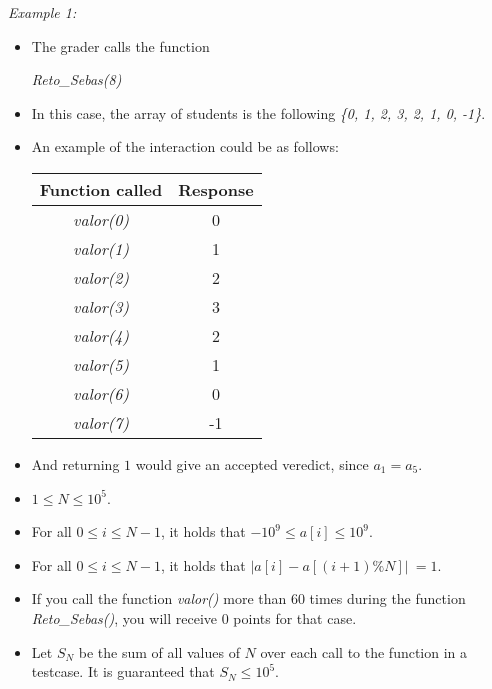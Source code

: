 \documentclass[12pt]{scrartcl}
\begin{document}
        {\itshape Example 1:}
        \begin{itemize}
            \item The grader calls the function 

            \begin{center}
                {\itshape Reto\_Sebas(8)}
            \end{center}

            \item In this case, the array of students is the following {\itshape \{0, 1, 2, 3, 2, 1, 0, -1\}}.
            \item An example of the interaction could be as follows:
            \begin{center}
                \begin{tabular}{|c|c|}
                    \hline
                     Function called & Response \\
                     \hline
                     {\itshape valor(0)} & 0 \\
                     \hline
                     {\itshape valor(1)} & 1 \\
                     \hline
                     {\itshape valor(2)} & 2 \\
                     \hline
                     {\itshape valor(3)} & 3 \\
                     \hline
                     {\itshape valor(4)} & 2 \\
                     \hline
                     {\itshape valor(5)} & 1 \\
                     \hline
                     {\itshape valor(6)} & 0 \\
                     \hline
                     {\itshape valor(7)} & -1 \\
                     \hline
                \end{tabular}
            \end{center}
            \item And returning $1$ would give an accepted veredict, since $a_1 = a_5$.
        \end{itemize}

        
        
        \begin{itemize}
            \item $1 \le N \le 10^5$.
            \item For all $0 \le i \le N - 1$, it holds that $-10^9 \le a[i] \le 10^9$.
            \item For all $0 \le i \le N - 1$, it holds that $\lvert a[i] - a[(i + 1)\%N] \lvert \ = 1$.
            \item If you call the function {\itshape valor()} more than 60 times during the function {\itshape Reto\_Sebas()}, you will receive 0 points for that case.
            \item Let $S_N$ be the sum of all values of $N$ over each call to the function in a testcase. It is guaranteed that $S_N \le 10^5$.
        \end{itemize}
    
\end{document}
